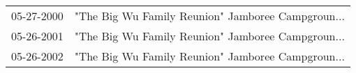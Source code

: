 \begin{supertabular}{ll}
 05-27-2000 &  "The Big Wu Family Reunion" Jamboree Campgroun... \\
 05-26-2001 &  "The Big Wu Family Reunion" Jamboree Campgroun... \\
 05-26-2002 &  "The Big Wu Family Reunion" Jamboree Campgroun... \\
\end{supertabular}
